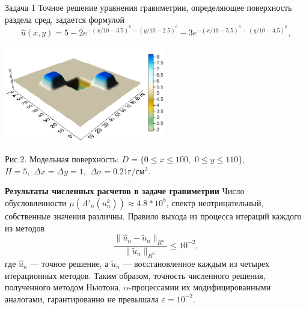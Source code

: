 \documentclass[10pt,pdf, mathserif, hyperref={unicode}]{beamer}
\begin{document}
\begin{frame}{Задача 1}
	Точное решение уравнения гравиметрии, определяющее поверхность раздела сред, задается формулой %
	\begin{equation*}
	\hat{u}(x,y)=5-2e^{-(x/10-3.5)^6-(y/10-2.5)^6}-3e^{-(x/10-5.5)^6-(y/10-4.5)^6},
	\end{equation*}
	\begin{center}
		
		\includegraphics[width=7cm, height=4 cm]{Gravy_exact.png}            %
	\end{center}
	
	\begin{center}
		Рис.2. Модельная поверхность: $D=\{0\le x\le 100, \,\,0\le y\le 110\}$, \\ $  H=5,\,\,\Delta x=\Delta y=1,\,\,\Delta\sigma=0.21$г/см$^3$.
	\end{center}
\end{frame}
\begin{frame}{\small\textbf{Результаты численных расчетов в задаче гравиметрии}}
	Число обусловленности $\mu(A'_n(u_n^k))\approx 4.8 * 10^{8}$, спектр неотрицательный, собственные значения различны. Правило выхода из процесса итераций каждого из методов
	$$\frac{\|\hat{u}_n-\tilde{u}_n\|_{R^n}}{\|\tilde{u}_n\|_{R^n}}\le 10^{-2},$$
	где $\hat{u}_n$ --- точное решение, а $\tilde{u}_n$ --- восстановленное каждым из четырех итерационных методов. Таким образом, точность численного решения, полученного методом Ньютона, $\alpha$-процессамии их модифицированными аналогами, гарантированно не превышала $\varepsilon=10^{-2}$.
\end{frame}
\end{document}
